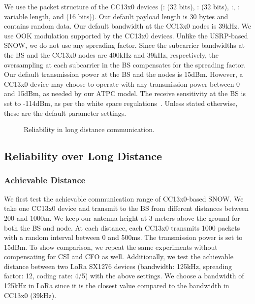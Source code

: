 We use the packet structure of the CC13x0 devices (: (32 bits), : (32 bits), :, : variable length, and  (16 bits)). Our default payload length is 30 bytes and contains random data. Our default bandwidth at the CC13x0 nodes is 39kHz. We use OOK modulation supported by the CC13x0 devices. Unlike the USRP-based SNOW, we do not use any spreading factor. Since the subcarrier bandwidths at the BS and the CC13x0 nodes are 400kHz and 39kHz, respectively, the oversampling at each subcarrier in the BS compensates for the spreading factor. Our default transmission power at the BS and the nodes is 15dBm. However, a CC13x0 device may choose to operate with any transmission power between 0 and 15dBm, as needed by our ATPC model. The receive sensitivity at the BS is set to -114dBm, as per the white space regulations~\cite{whitespaceSurvey}. Unless stated otherwise, these are the default parameter settings.

\begin{figure*}[!htbp]
    \centering
      \hfill
      \hfill
    \caption{Reliability in long distance communication.}
    \label{fig:prr}
\end{figure*}
\subsection{Reliability over Long Distance}\label{sec:prr_dist}
\subsubsection{Achievable Distance}
We first test the achievable communication range of CC13x0-based SNOW. We take one CC13x0 device and transmit to the BS from different distances between 200 and 1000m. We keep our antenna height at 3 meters above the ground for both the BS and node. At each distance, each CC13x0 transmits 1000 packets with a random interval between 0 and 500ms. The transmission power is set to 15dBm. To show comparison, we repeat the same experiments without compensating for CSI and CFO as well. Additionally, we test the achievable distance between two LoRa SX1276 devices (bandwidth: 125kHz, spreading factor: 12, coding rate: 4/5) with the above settings. We choose a bandwidth of 125kHz in LoRa since it is the closest value compared to the bandwidth in CC13x0 (39kHz).


